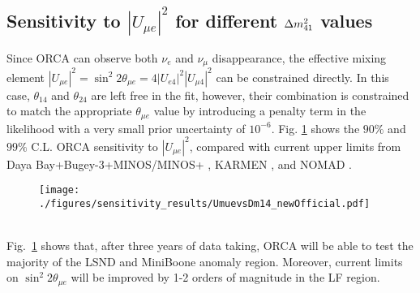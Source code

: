 \subsection{Sensitivity to $|U_{\mu e}|^2$ for different $\Delta m^2_{41}$ values}
Since ORCA can observe both $\nu_e$ and $\nu_\mu$ disappearance, the effective mixing element $|U_{\mu e}|^2 = \sin^2 2\theta_{\mu e} = 4 |U_{e4}|^2|U_{\mu4}|^2$ can be constrained directly. In this case, $\theta_{14}$ and $\theta_{24}$ are left free in the fit, however, their combination is constrained to match the appropriate $\theta_{\mu e}$ value by introducing a penalty term in the likelihood with a very small prior uncertainty of $10^{-6}$. Fig. \ref{fig:sen-Umue} shows the $90\%$ and $99\%$ C.L. ORCA sensitivity to $|U_{\mu e}|^2$, compared with current upper limits from Daya Bay+Bugey-3+MINOS/MINOS+ \cite{numu_disapp_minos}, KARMEN \cite{karmen}, and NOMAD \cite{nomad}.
\begin{figure}[h]
	\centering
	\texttt{[image: ./figures/sensitivity\_results/UmuevsDm14\_newOfficial.pdf]}
	\label{fig:sen-Umue}
\end{figure}
\\
Fig.\ \ref{fig:sen-Umue} shows that, after three years of data taking, ORCA will be able to test the majority of the LSND \cite{LSND} and MiniBoone \cite{Miniboone} anomaly region. Moreover, current limits on $\sin^2 2\theta_{\mu e}$ will be improved by 1-2 orders of magnitude in the LF region. 


